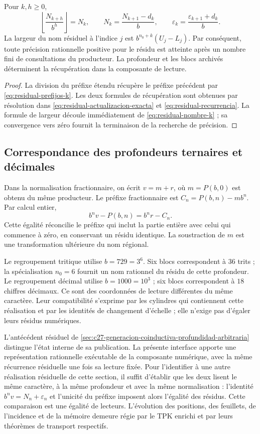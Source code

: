\begin{corollary}
\label{cor:residual-recuperacion}
Pour \(k,h\geq0\),
\[
 \left\lfloor\frac{N_{k+h}}{b^h}\right\rfloor=N_k,
 \qquad N_k=\frac{N_{k+1}-d_k}{b},
 \qquad \varepsilon_k=\frac{\varepsilon_{k+1}+d_k}{b}.
\]
La largeur du nom résiduel à l'indice \(j\) est
\(b^{n_0+k}(U_j-L_j)\). Par conséquent, toute précision rationnelle
positive pour le résidu est atteinte après un nombre fini de consultations du
producteur. La profondeur et les blocs archivés déterminent la
récupération dans la composante de lecture.
\end{corollary}
\begin{proof}
La division du préfixe étendu récupère le préfixe précédent par
\eqref{eq:residual-prefijos-k}. Les deux formules de récupération sont
obtenues par résolution dans \eqref{eq:residual-actualizacion-exacta} et
\eqref{eq:residual-recurrencia}. La formule de largeur découle immédiatement de
\eqref{eq:residual-nombre-k} ; sa convergence vers zéro fournit la
terminaison de la recherche de précision.
\end{proof}

\subsection{Correspondance des profondeurs ternaires et décimales}
\label{subsec:residual-bases}

Dans la normalisation fractionnaire, on écrit \(v=m+r\), où
\(m=P(b,0)\) est obtenu du même producteur. Le préfixe fractionnaire est
\(C_n=P(b,n)-mb^n\). Par calcul entier,
\[
 b^n v-P(b,n)=b^n r-C_n.
\]
Cette égalité réconcilie le préfixe qui inclut la partie entière avec celui qui
commence à zéro, en conservant un résidu identique. La soustraction de \(m\)
est une transformation ultérieure du nom régional.

Le regroupement tritique utilise \(b=729=3^6\). Six blocs correspondent à
\(36\) trits ; la spécialisation \(n_0=6\) fournit un nom
rationnel du résidu de cette profondeur. Le regroupement décimal utilise
\(b=1000=10^3\) ; six blocs correspondent à \(18\) chiffres décimaux.
Ce sont des coordonnées de lecture différentes du même caractère. Leur compatibilité
s'exprime par les cylindres qui contiennent cette réalisation et par les
identités de changement d'échelle ; elle n'exige pas d'égaler leurs résidus numériques.

L'antécédent résiduel de
\cref{sec:c27-generacion-coinductiva-profundidad-arbitraria} distingue
l'état interne de sa publication. La présente interface apporte une
représentation rationnelle exécutable de la composante numérique, avec la même
récurrence résiduelle une fois sa lecture fixée. Pour l'identifier à une autre
réalisation résiduelle de cette section, il suffit d'établir que les deux lisent le même
caractère, à la même profondeur et avec la même normalisation : l'identité
\(b^n v=N_n+\varepsilon_n\) et l'unicité du préfixe imposent alors
l'égalité des résidus. Cette comparaison est une égalité de lecteurs.
L'évolution des positions, des feuillets, de l'incidence et de la mémoire demeure régie
par le TPK enrichi et par leurs théorèmes de transport respectifs.

